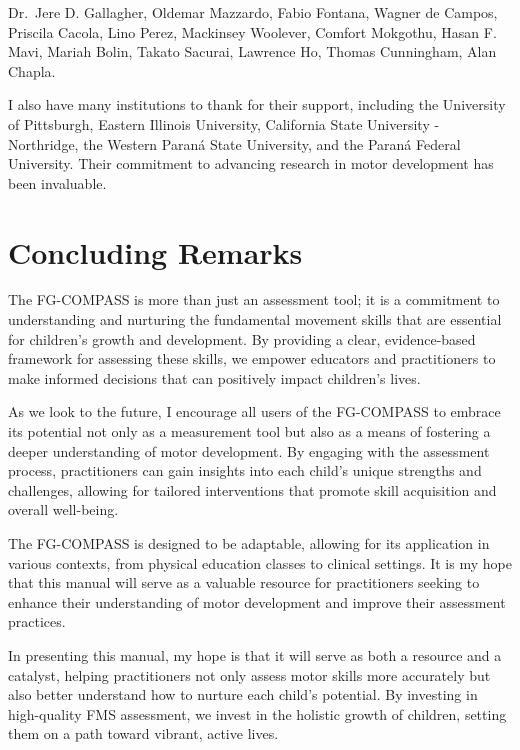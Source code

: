 \documentclass[
  letterpaper,
  DIV=11,
  numbers=noendperiod]{scrreprt}
\begin{document}
Dr.~Jere D. Gallagher, Oldemar Mazzardo, Fabio Fontana, Wagner de
Campos, Priscila Cacola, Lino Perez, Mackinsey Woolever, Comfort
Mokgothu, Hasan F. Mavi, Mariah Bolin, Takato Sacurai, Lawrence Ho,
Thomas Cunningham, Alan Chapla.

I also have many institutions to thank for their support, including the
University of Pittsburgh, Eastern Illinois University, California State
University - Northridge, the Western Paraná State University, and the
Paraná Federal University. Their commitment to advancing research in
motor development has been invaluable.

\section*{Concluding Remarks}\label{concluding-remarks}


The FG-COMPASS is more than just an assessment tool; it is a commitment
to understanding and nurturing the fundamental movement skills that are
essential for children's growth and development. By providing a clear,
evidence-based framework for assessing these skills, we empower
educators and practitioners to make informed decisions that can
positively impact children's lives.

As we look to the future, I encourage all users of the FG-COMPASS to
embrace its potential not only as a measurement tool but also as a means
of fostering a deeper understanding of motor development. By engaging
with the assessment process, practitioners can gain insights into each
child's unique strengths and challenges, allowing for tailored
interventions that promote skill acquisition and overall well-being.

The FG-COMPASS is designed to be adaptable, allowing for its application
in various contexts, from physical education classes to clinical
settings. It is my hope that this manual will serve as a valuable
resource for practitioners seeking to enhance their understanding of
motor development and improve their assessment practices.

In presenting this manual, my hope is that it will serve as both a
resource and a catalyst, helping practitioners not only assess motor
skills more accurately but also better understand how to nurture each
child's potential. By investing in high-quality FMS assessment, we
invest in the holistic growth of children, setting them on a path toward
vibrant, active lives.
\end{document}
